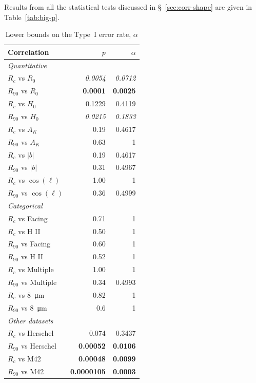 Results from all the statistical tests discussed in \S~\ref{sec:corr-shape} are given in Table~\ref{tab:big-p}.  


\begin{table}
  \caption{Lower bounds on the Type~I error rate, \(\alpha\)}
  \label{tab:type-I}
  \centering
  \begin{tabular}{lrr} \toprule
    Correlation & \(p\) & \(\alpha\) \\
    \midrule
    \multicolumn{3}{l}{\itshape Quantitative \dotfill}\\
    \(R_c\) vs \(R_0\) & \textit{0.0054} & \textit{0.0712} \\
    \(R_{90}\) vs \(R_0\) & \textbf{0.0001} & \textbf{0.0025} \\
    \(R_c\) vs \(H_0\) & 0.1229 & 0.4119 \\
    \(R_{90}\) vs \(H_0\) & \textit{0.0215} & \textit{0.1833} \\
    \(R_c\) vs \(A_K\) & 0.19 & 0.4617 \\
    \(R_{90}\) vs \(A_K\) & 0.63 & 1 \\
    \(R_c\) vs \(|b|\) & 0.19 & 0.4617 \\
    \(R_{90}\) vs \(|b|\) & 0.31 & 0.4967 \\
    \(R_c\) vs \(\cos(\ell)\) & 1.00 & 1 \\
    \(R_{90}\) vs \(\cos(\ell)\) & 0.36 & 0.4999 \\
    \midrule
    \multicolumn{3}{l}{\itshape Categorical} \dotfill\\
    \(R_c\) vs Facing & 0.71 & 1 \\
    \(R_c\) vs H II & 0.50 & 1 \\
    \(R_{90}\) vs Facing & 0.60 & 1 \\
    \(R_{90}\) vs H II & 0.52 & 1 \\
    \(R_c\) vs Multiple & 1.00 & 1 \\
    \(R_{90}\) vs Multiple & 0.34 & 0.4993 \\
    \(R_c\) vs \SI{8}{\um} & 0.82 & 1 \\
    \(R_{90}\) vs \SI{8}{\um} & 0.6 & 1 \\
    \midrule
    \multicolumn{3}{l}{\itshape Other datasets} \dotfill\\
    \(R_c\) vs Herschel & 0.074 & 0.3437 \\
    \(R_{90}\) vs Herschel & \textbf{0.00052} & \textbf{0.0106} \\
    \(R_c\) vs M42 & \textbf{0.00048} & \textbf{0.0099} \\
    \(R_{90}\) vs M42 & \textbf{0.0000105} & \textbf{0.0003} \\
    \bottomrule
  \end{tabular}
\end{table}


